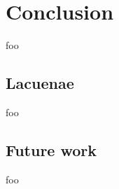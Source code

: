 \chapter{Conclusion}
\label{chap:conclusion}

foo

\section{Lacuenae}

foo

\section{Future work}

foo